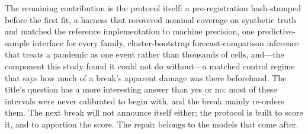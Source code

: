 The remaining contribution is the protocol itself: a pre-registration
hash-stamped before the first fit, a harness that recovered nominal
coverage on synthetic truth and matched the reference implementation to
machine precision, one predictive-sample interface for every family,
cluster-bootstrap forecast-comparison inference that treats a pandemic as
one event rather than thousands of cells, and---the component this study
found it could not do without---a matched control regime that says how
much of a break's apparent damage was there beforehand. The title's
question has a more interesting answer than yes or no: most of these
intervals were never calibrated to begin with, and the break mainly
re-orders them. The next break will not announce itself either; the
protocol is built to score it, and to apportion the score. The repair
belongs to the models that come after.
